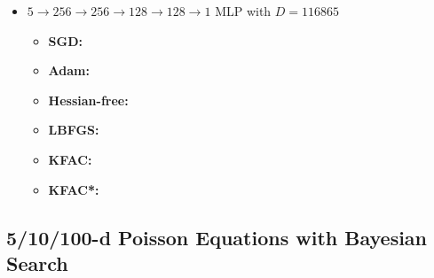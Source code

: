 \begin{itemize}
\item $5 \to 256 \to 256\to 128 \to 128 \to 1$ MLP with $D=\num{116865}$
  \begin{itemize}
    \def\pathToRuns{../kfac_pinns_exp/exp19_poisson5d_mlp_tanh_256/tex}
  \item \textbf{SGD:} 
  \item \textbf{Adam:} 
  \item \textbf{Hessian-free:} 
  \item \textbf{LBFGS:} 
  \item \textbf{KFAC:} 
  \item \textbf{KFAC*:} 
  \end{itemize}
\end{itemize}

\subsection{5/10/100-d Poisson Equations with Bayesian Search}\label{sec:high-dimensional-poissons-app}

